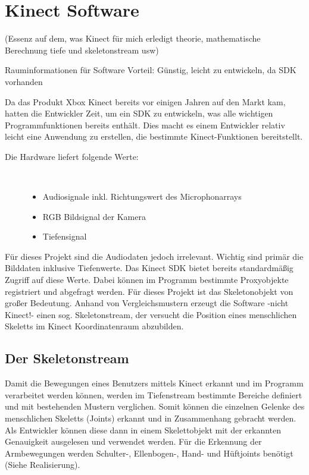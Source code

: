 \section{Kinect Software}\label{Software}

(Essenz auf dem, was Kinect für mich erledigt theorie, mathematische Berechnung tiefe und skeletonstream usw)

Rauminformationen für Software
Vorteil: Günstig, leicht zu entwickeln, da SDK vorhanden

Da das Produkt Xbox Kinect bereits vor einigen Jahren auf den Markt kam, hatten die Entwickler Zeit, um ein SDK zu entwickeln, was alle wichtigen Programmfunktionen bereits enthält. Dies macht es einem Entwickler relativ leicht eine Anwendung zu erstellen, die bestimmte Kinect-Funktionen bereitstellt. 

\begin{description}
	\item[Die Hardware liefert folgende Werte:]~\par
	\begin{itemize}
		\item Audiosignale inkl. Richtungswert des Microphonarrays
		\item RGB Bildsignal der Kamera
		\item Tiefensignal
	\end{itemize}
\end{description}

\noindent
Für dieses Projekt sind die Audiodaten jedoch irrelevant. Wichtig sind primär die Bilddaten inklusive Tiefenwerte.
Das Kinect SDK bietet bereits standardmäßig Zugriff auf diese Werte. Dabei können im Programm bestimmte Proxyobjekte registriert und abgefragt werden. Für dieses Projekt ist das Skeletonobjekt von großer Bedeutung. Anhand von Vergleichsmustern erzeugt die Software -nicht Kinect!- einen sog. Skeletonstream, der versucht die Position eines menschlichen Skeletts im Kinect Koordinatenraum abzubilden.\cite{SWB-376536934}

\subsection{Der Skeletonstream}
Damit die Bewegungen eines Benutzers mittels Kinect erkannt und im Programm verarbeitet werden können, werden im Tiefenstream bestimmte Bereiche definiert und mit bestehenden Mustern verglichen. Somit können die einzelnen Gelenke des menschlichen Skeletts (Joints) erkannt und in Zusammenhang gebracht werden. Als Entwickler können diese dann in einem Skelettobjekt mit der erkannten Genauigkeit ausgelesen und verwendet werden. Für die Erkennung der Armbewegungen werden Schulter-, Ellenbogen-, Hand- und Hüftjoints benötigt (Siehe Realisierung).

